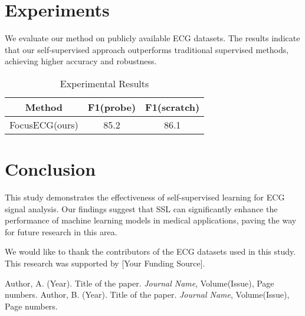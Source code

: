 \documentclass[sigconf]{acmart}
\begin{document}
\section{Experiments}
We evaluate our method on publicly available ECG datasets. The results indicate that our self-supervised approach outperforms traditional supervised methods, achieving higher accuracy and robustness.

\begin{table}
\caption{Experimental Results}
\begin{tabular}{ccc}
\hline
Method & F1(probe) & F1(scratch) \\
\hline
FocusECG(ours) & 85.2 & 86.1 \\

\hline
\end{tabular}
\end{table}






\section{Conclusion}
This study demonstrates the effectiveness of self-supervised learning for ECG signal analysis. Our findings suggest that SSL can significantly enhance the performance of machine learning models in medical applications, paving the way for future research in this area.

\begin{acks}
We would like to thank the contributors of the ECG datasets used in this study. This research was supported by [Your Funding Source].
\end{acks}

\begin{thebibliography}{99}
 Author, A. (Year). Title of the paper. \textit{Journal Name}, Volume(Issue), Page numbers.
 Author, B. (Year). Title of the paper. \textit{Journal Name}, Volume(Issue), Page numbers.
\end{thebibliography}
\end{document}
